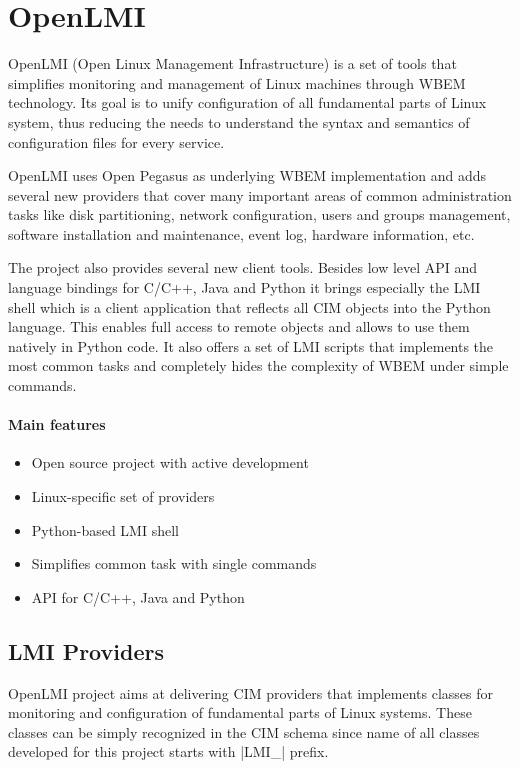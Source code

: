 \chapter{OpenLMI}
\label{chapter:openlmi}

OpenLMI (Open Linux Management Infrastructure) is a set of tools that simplifies
monitoring and management of Linux machines through WBEM technology. Its goal is
to unify configuration of all fundamental parts of Linux system, thus reducing
the needs to understand the syntax and semantics of configuration files for
every service.

OpenLMI uses Open Pegasus as underlying WBEM implementation and adds several new
providers that cover many important areas of common administration tasks like
disk partitioning, network configuration, users and groups management, software
installation and maintenance, event log, hardware information, etc.

The project also provides several new client tools. Besides low level API and
language bindings for C/C++, Java and Python it brings especially the LMI shell
which is a client application that reflects all CIM objects into the Python
language. This enables full access to remote objects and allows to use them
natively in Python code. It also offers a set of LMI scripts that implements the
most common tasks and completely hides the complexity of WBEM under simple
commands.

\subsubsection{Main features}

\begin{itemize}
  \item Open source project with active development
  \item Linux-specific set of providers
  \item Python-based LMI shell
  \item Simplifies common task with single commands
  \item API for C/C++, Java and Python
\end{itemize}

\section{LMI Providers}
\label{openlmi:providers}

OpenLMI project aims at delivering CIM providers that implements classes for
monitoring and configuration of fundamental parts of Linux systems.
These classes can be simply recognized in the CIM schema since name of all
classes developed for this project starts with |LMI_| prefix.

